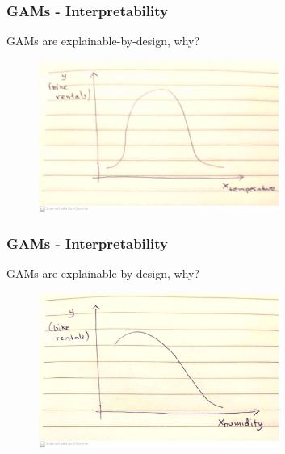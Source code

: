 \documentclass{beamer}
\begin{document}
\begin{frame}
  \frametitle{GAMs - Interpretability}

  GAMs are explainable-by-design, why?

  \noindent\makebox[\linewidth]{\rule{\paperwidth}{0.4pt}}

  \begin{figure}[ht]
    \centering
    \includegraphics[width=0.7\textwidth]{./figures/gam_temperature.jpg}
  \end{figure}

\end{frame}


\begin{frame}
  \frametitle{GAMs - Interpretability}

  GAMs are explainable-by-design, why?

  \noindent\makebox[\linewidth]{\rule{\paperwidth}{0.4pt}}

  \begin{figure}[ht]
    \centering
    \includegraphics[width=0.7\textwidth]{./figures/gam_humidity.jpg}
  \end{figure}

\end{frame}
\end{document}
